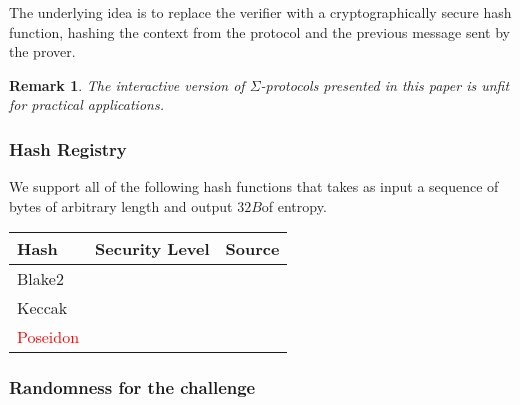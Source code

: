 \documentclass[runningheads,11pt]{article}
\newtheorem{remark}{Remark}
\newcommand{\unsure}[1]{\textcolor{red}{#1}}
\newcommand{\seedlen}{\ensuremath{32B}}
\begin{document}
The underlying idea is to replace the verifier with a cryptographically secure hash function, hashing the context from the protocol and the previous message sent by the prover.

\begin{remark}
The interactive version of $\Sigma$-protocols presented in this paper is unfit for practical applications.
\end{remark}

\subsubsection{Hash Registry}

We support all of the following hash functions that takes as input a sequence of bytes of arbitrary length and output \seedlen of entropy.

\begin{center}
  \begin{tabular}{lll}
  Hash & Security Level & Source \\
  \hline
  Blake2 \\
  Keccak & \\
  \unsure{Poseidon} &\\
  \end{tabular}
\end{center}

\subsubsection{Randomness for the challenge}
\label{sec:fs-challenge}

\end{document}
